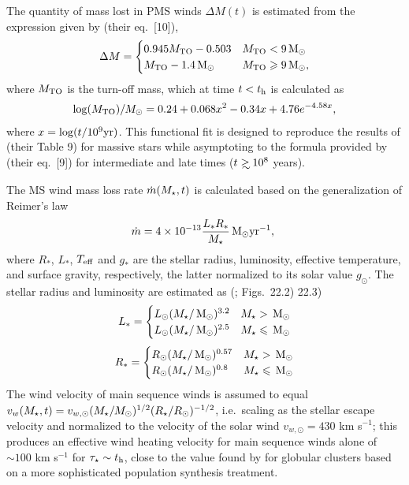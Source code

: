 The quantity of mass lost in PMS winds $\Delta M(t)$ is estimated from
the expression given by \citet{CiottiOstriker:2007a} (their eq.~[10]),
\begin{align}
\Delta M=
\begin{cases}
0.945 M_{\rm TO}-0.503 & M_{\rm TO} < 9 \,{\rm M_\odot}\\
 M_{\rm TO}-1.4 \,{\rm M_\odot} &  M_{\rm TO} \geqslant 9 \,{\rm M_\odot},
\end{cases}
\end{align}
where $M_{\rm TO}$ is the turn-off mass, which at time $t < t_{\rm h}$ is calculated as
\begin{align}
\log(M_{\rm TO})/M_{\odot} =0.24 + 0.068 x^2-0.34 x+4.76 e^{-4.58 x},
\end{align}
where $x=\log(t/10^9 {\rm yr})$.  This functional fit is designed
to reproduce the results of \citet{MaederMeynet:1987a} (their Table 9)
for massive stars while asymptoting to the formula provided by
\citet{CiottiOstriker:2007a} (their eq.~[9]) for intermediate and late
times ($t \gsim 10^8$ years).

The MS wind mass loss rate $\dot{m}(M_{\star}, t)$ is calculated based on
the generalization of Reimer's law
\begin{align}
  \dot{m}=4 \times 10^{-13} \frac{L_* R_*}{M_{\star}} \,{\rm M_\odot} {\rm yr}^{-1},\
\end{align}
where  $R_*$, $L_*$, $T_{\rm eff}$ and $g_*$ are the stellar radius,
luminosity, effective temperature, and surface gravity, respectively, the latter normalized to its solar value $g_{\odot}$.  The stellar radius and luminosity are estimated as (\citet{Kippenhahn&Weigert90}; Figs.~22.2) 22.3)
\begin{align}
L_*=
\begin{cases}
L_{\odot} (M_{\star}/\,{\rm M_\odot})^{3.2} & M_{\star} > \,{\rm M_\odot} \\
L_{\odot} (M_{\star}/\,{\rm M_\odot})^{2.5} & M_{\star} \leqslant \,{\rm M_\odot}
\end{cases}
\end{align}
\begin{align}
R_*=
\begin{cases}
R_{\odot} (M_{\star}/\,{\rm M_\odot})^{0.57} & M_{\star} > \,{\rm M_\odot} \\
R_{\odot} (M_{\star}/\,{\rm M_\odot})^{0.8} & M_{\star} \leqslant \,{\rm M_\odot}
\end{cases}
\end{align}
The wind velocity of main sequence winds is assumed to equal $v_w
(M_{\star}, t) =
v_{w,\odot}(M_{\star}/M_{\odot})^{1/2}(R_{\star}/R_{\odot})^{-1/2}$,
i.e.~scaling as the stellar escape velocity and normalized to the
velocity of the solar wind $v_{w,\odot} = 430$ km s$^{-1}$; this
produces an effective wind heating velocity for main sequence winds
alone of $\sim 100$ km s$^{-1}$ for $\tau_{\star} \sim t_{\rm h}$,
close to the value found by \citet{NaimanSoares-Furtado+:2013a} for
globular clusters based on a more sophisticated population synthesis
treatment.

